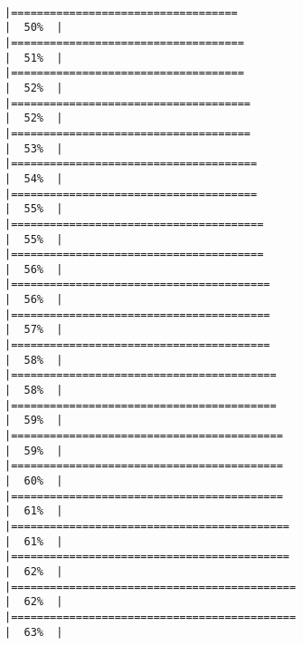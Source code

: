 \documentclass[12pt,twoside]{reedthesis}
\begin{document}
\begin{verbatim}
                                                                         |===================================                                   |  50%  |                                                                              |====================================                                  |  51%  |                                                                              |====================================                                  |  52%  |                                                                              |=====================================                                 |  52%  |                                                                              |=====================================                                 |  53%  |                                                                              |======================================                                |  54%  |                                                                              |======================================                                |  55%  |                                                                              |=======================================                               |  55%  |                                                                              |=======================================                               |  56%  |                                                                              |========================================                              |  56%  |                                                                              |========================================                              |  57%  |                                                                              |========================================                              |  58%  |                                                                              |=========================================                             |  58%  |                                                                              |=========================================                             |  59%  |                                                                              |==========================================                            |  59%  |                                                                              |==========================================                            |  60%  |                                                                              |==========================================                            |  61%  |                                                                              |===========================================                           |  61%  |                                                                              |===========================================                           |  62%  |                                                                              |============================================                          |  62%  |                                                                              |============================================                          |  63%  |      
\end{verbatim}
\end{document}
